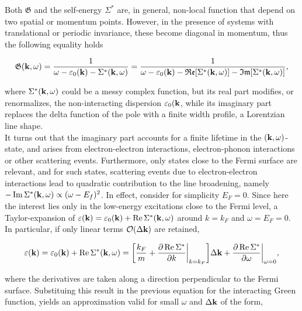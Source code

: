 \documentclass{homework}
\begin{document}
Both $\mathfrak{G}$ and the self-energy $\Sigma^*$ are, in general, non-local function that depend on two spatial or momentum points. However, in the presence of systems with translational or periodic invariance, these become diagonal in momentum, thus the following equality holds 

\begin{equation}
    \mathfrak{G}({\bf k}, \omega) = \frac{1}{\omega - \varepsilon_0({\bf k}) - \Sigma^*({\bf k}, \omega)} = \frac{1}{\omega - \varepsilon_0({\bf k}) - \mathfrak{R}\mathfrak{e}[\Sigma^*({\bf k}, \omega)]- \mathfrak{I}\mathfrak{m}[\Sigma^*({\bf k}, \omega)]},
\end{equation}

where $\Sigma^*({\bf k}, \omega)$ could be a messy complex function, but its real part modifies, or renormalizes, the non-interacting dispersion $\varepsilon_0({\bf k}$, while its imaginary part replaces the delta function of the pole with a finite width profile, a Lorentzian line shape. \\

It turns out that the imaginary part accounts for a finite lifetime in the $({\bf k}, \omega)$-state, and arises from electron-electron interactions, electron-phonon interactions or other scattering events. Furthermore, only states close to the Fermi surface are relevant, and for such states, scattering events due to electron-electron interactions lead to quadratic contribution to the line broadening, namely $-\Im \Sigma^*({\bf k}, \omega) \propto (\omega - E_f)^2$. In effect, consider for simplicity $E_F = 0$. Since here the interest lies only in the low-energy excitations close to the Fermi level, a Taylor-expansion of $\varepsilon({\bf k}) = \varepsilon_{0}({\bf k}) + \Re \Sigma^*({\bf k}, \omega)$ around $k = k_F$ and $\omega = E_F = 0$. In particular, if only linear terms $\mathcal{O}(\Delta {\bf k})$ are retained,

\begin{equation}
    \varepsilon({\bf k}) = \varepsilon_{0}({\bf k}) + \Re \Sigma^*({\bf k}, \omega) = \bigg[\frac{k_F}{m} + \frac{\partial \Re \Sigma^*}{\partial k}\bigg|_{k=k_F}\bigg] \Delta {\bf k} + \frac{\partial \Re \Sigma^*}{\partial \omega}\bigg|_{\omega = 0},
\end{equation}

where the derivatives are taken along a direction perpendicular to the Fermi surface. Substituing this result in the previous equation for the interacting Green function, yields an approximation valid for small $\omega$ and $\Delta {\bf k}$ of the form,
\end{document}
